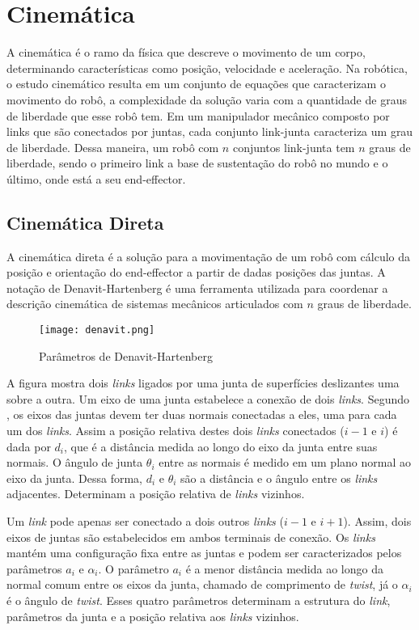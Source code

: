 \section{Cinemática}\label{sec:cinem}
A cinemática é o ramo da física que descreve o movimento de um corpo, determinando características como posição, velocidade e aceleração. Na robótica, o estudo cinemático resulta em um conjunto de equações que caracterizam o movimento do robô, a complexidade da solução varia com a quantidade de graus de liberdade que esse robô tem. Em um manipulador mecânico composto por links que são conectados por juntas, cada conjunto link-junta caracteriza um grau de liberdade. Dessa maneira, um robô com $n$ conjuntos link-junta tem $n$ graus de liberdade, sendo o primeiro link a base de sustentação do robô no mundo e o último, onde está a seu end-effector.

\subsection{Cinemática Direta}\label{sec:cinem_dir}
A cinemática direta é a solução para a movimentação de um robô com cálculo da posição e orientação do end-effector a partir de dadas posições das juntas. A notação de Denavit-Hartenberg é uma ferramenta utilizada para coordenar a descrição cinemática de sistemas mecânicos articulados com $n$ graus de liberdade.

\begin{figure}[h!]												
	\centering												
	\texttt{[image: denavit.png]}			
	\caption{Parâmetros de Denavit-Hartenberg}		
	\label{img:denavit}	
\end{figure}

A figura mostra dois \textit{links} ligados por uma junta de superfícies deslizantes uma sobre a outra. Um eixo de uma junta estabelece a conexão de dois \textit{links}. Segundo \cite{romanorobotica}, os eixos das juntas devem ter duas normais conectadas a eles, uma para cada um dos \textit{links}. Assim a posição relativa destes dois \textit{links} conectados ($i-1$ e $i$) é dada por $d_{i}$, que é a distância medida ao longo do eixo da junta entre suas normais. O ângulo de junta $\theta_{i}$ entre as normais é medido em um plano normal ao eixo da junta. Dessa forma, $d_{i}$ e $\theta_{i}$ são a distância e o ângulo entre os \textit{links} adjacentes. Determinam a posição relativa de \textit{links} vizinhos.

Um \textit{link} pode apenas ser conectado a dois outros \textit{links} ($i-1$ e $i+1$). Assim, dois eixos de juntas são estabelecidos em ambos terminais de conexão. Os \textit{links} mantém uma configuração fixa entre as juntas e podem ser caracterizados pelos parâmetros $a_{i}$ e $\alpha_{i}$. O parâmetro $a_{i}$ é a menor distância medida ao longo da normal comum entre os eixos da junta, chamado de comprimento de \textit{twist}, já o $\alpha_{i}$ é o ângulo de \textit{twist}. Esses quatro parâmetros determinam a estrutura do \textit{link}, parâmetros da junta e a posição relativa aos \textit{links} vizinhos.

